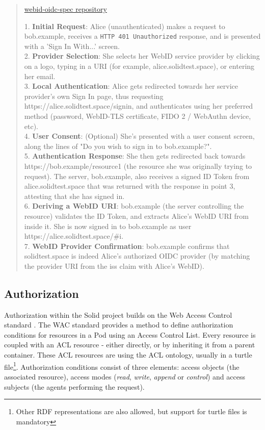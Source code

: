 \begin{quote}{\href{https://github.com/solid/webid-oidc-spec}{webid-oidc-spec repository}}

    1. \textbf{Initial Request}: Alice (unauthenticated) makes a request to bob.example, receives a \texttt{HTTP 401 Unauthorized} response, and is presented with a 'Sign In With...' screen.\\
    
    2. \textbf{Provider Selection}: She selects her WebID service provider by clicking on a logo, typing in a URI (for example, alice.solidtest.space), or entering her email.\\
    
    3. \textbf{Local Authentication}: Alice gets redirected towards her service provider's own Sign In page, thus requesting https://alice.solidtest.space/signin, and authenticates using her preferred method (password, WebID-TLS certificate, FIDO 2 / WebAuthn device, etc).\\
    
    4. \textbf{User Consent}: (Optional) She's presented with a user consent screen, along the lines of "Do you wish to sign in to bob.example?".\\
    
    5. \textbf{Authentication Response}: She then gets redirected back towards https://bob.example/resource1 (the resource she was originally trying to request). The server, bob.example, also receives a signed ID Token from alice.solidtest.space that was returned with the response in point 3, attesting that she has signed in.\\
    
    6. \textbf{Deriving a WebID URI}: bob.example (the server controlling the resource) validates the ID Token, and extracts Alice's WebID URI from inside it. She is now signed in to bob.example as user https://alice.solidtest.space/\#i.\\
    
    7. \textbf{WebID Provider Confirmation}: bob.example confirms that solidtest.space is indeed Alice's authorized OIDC provider (by matching the provider URI from the iss claim with Alice's WebID).

\end{quote}

\subsection{Authorization}
Authorization within the Solid project builds on the Web Access Control standard \citep{wac}. The WAC standard provides a method to define authorization conditions for resources in a Pod using an Access Control List. Every resource is coupled with an ACL resource - either directly, or by inheriting it from a parent container. These ACL resources are using the ACL ontology, usually in a turtle file\footnote{Other RDF representations are also allowed, but support for turtle files is mandatory}. Authorization conditions consist of three elements: access objects (the associated resource), access modes (\textit{read}, \textit{write}, \textit{append} or \textit{control}) and access subjects (the agents performing the request).

